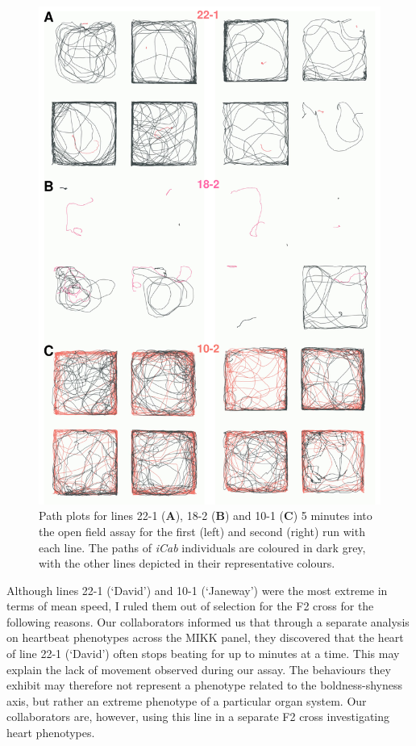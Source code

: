 \documentclass[
]{book}
\begin{document}
\begin{figure}
\includegraphics[width=1\linewidth]{figs/mikk_behaviour/path_plot_22-1_18-2_10-1_300} \caption{Path plots for lines 22-1 (\textbf{A}), 18-2 (\textbf{B}) and 10-1 (\textbf{C}) 5 minutes into the open field assay for the first (left) and second (right) run with each line. The paths of \emph{\textcolor{iCab_424B4D}{iCab}} individuals are coloured in dark grey, with the other lines depicted in their representative colours.}\label{fig:extreme-paths}
\end{figure}

Although lines \textcolor{22-1 (‘David’)_FB737A}{22-1 (‘David’)} and \textcolor{10-1 (‘Janeway’)_F8766D}{10-1 (‘Janeway’)} were the most extreme in terms of mean speed, I ruled them out of selection for the F2 cross for the following reasons. Our collaborators informed us that through a separate analysis on heartbeat phenotypes across the MIKK panel, they discovered that the heart of line \textcolor{22-1 (‘David’)_FB737A}{22-1 (‘David’)} often stops beating for up to minutes at a time. This may explain the lack of movement observed during our assay. The behaviours they exhibit may therefore not represent a phenotype related to the boldness-shyness axis, but rather an extreme phenotype of a particular organ system. Our collaborators are, however, using this line in a separate F2 cross investigating heart phenotypes.
\end{document}
